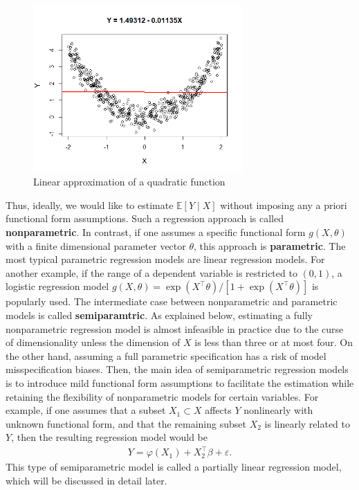 \documentclass[10.5pt, A4paper, openany, uplatex]{book}
\newcommand{\eps}{\varepsilon}
\newcommand{\E}{\mathbb{E}}
\numberwithin{equation}{section}
\begin{document}
\begin{figure}[h!]
	\begin{center}
		\includegraphics[width = 8cm]{reg.png}
		\caption{Linear approximation of a quadratic function}
	\end{center}
\end{figure}


Thus, ideally, we would like to estimate $\E [Y \mid X]$ without imposing any a priori functional form assumptions.
Such a regression approach is called \textbf{nonparametric}.
In contrast, if one assumes a specific functional form $g(X, \theta)$ with a finite dimensional parameter vector $\theta$, this approach is \textbf{parametric}.
The most typical parametric regression models are linear regression models.
For another example, if the range of a dependent variable is restricted to $(0,1)$, a logistic regression model $g(X, \theta) = \exp(X^\top \theta)/[1 + \exp(X^\top \theta)]$ is popularly used. 
The intermediate case between nonparametric and parametric models is called \textbf{semiparamtric}.
As explained below, estimating a fully nonparametric regression model is almost infeasible in practice due to the curse of dimensionality unless the dimension of $X$ is less than three or at most four.
On the other hand, assuming a full parametric specification has a risk of model misspecification biases.
Then, the main idea of semiparametric regression models is to introduce mild functional form assumptions to facilitate the estimation while retaining the flexibility of nonparametric models for certain variables.
For example, if one assumes that a subset $X_1 \subset X$ affects $Y$ nonlinearly with unknown functional form, and that the remaining subset $X_2$ is linearly related to $Y$, then the resulting regression model would be 
\begin{align*}
	Y = \varphi(X_1) + X_2^\top\beta + \eps.
\end{align*}
This type of semiparametric model is called a partially linear regression model, which will be discussed in detail later.
\end{document}
